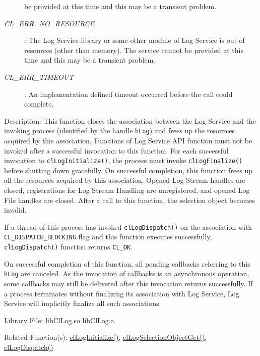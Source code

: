 \begin{flushleft}
\begin{Desc}
\begin{description}
be provided at this time and this may be a transient problem.
\item[{\em CL\_\-ERR\_\-NO\_\-RESOURCE}]:  The Log Service library or some other module of Log Service is out of resources 
(other than memory). The service cannot be provided at this time and this may be a transient problem.
\item[{\em CL\_\-ERR\_\-TIMEOUT}]: An implementation defined timeout occurred before the call could complete.
\end{description}
\end{Desc}
\begin{Desc}
\item[Description:] This function closes the association between the Log Service and the invoking process (identified by the handle {\tt{hLog}}) and frees up
the resources acquired by this association. Functions of Log Service API function must not be invoked after a successful invocation to this 
function. For each successful invocation to {\tt{clLogInitialize()}}, the process must invoke {\tt{clLogFinalize()}} before shutting down gracefully. 
On successful completion, this function frees up all the resources acquired by this association. Opened Log Stream handles are closed, 
registrations for Log Stream Handling are unregistered, and opened Log File handles are closed. After a call to this function, the selection object 
becomes invalid.
\par
If a thread of this process has invoked {\tt{clLogDispatch()}} on the association with {\tt{CL\_\-DISPATCH\_\-BLOCKING}} flag and this function executes 
successfully, {\tt{clLogDispatch()}} function returns {\tt{CL\_\-OK}}. 
\par
On successful completion of this function, all pending callbacks referring to this {\tt{hLog}} are canceled. As the invocation of callbacks is an 
asynchronous operation, some callbacks may still be delivered after this invocation returns successfully.
If a process terminates without finalizing its association with Log Service, Log Service will implicitly finalize all such associations.
\end{Desc}
\begin{Desc}
\item[Library File:] libClLog.so
\newline
libClLog.a
\end{Desc}
\begin{Desc}
\item[Related Function(s):]\hyperlink{pagelog101}{clLogInitialize()}, \hyperlink{pagelog103}{clLogSelectionObjectGet()}, \hyperlink{pagelog104}{clLogDispatch()}\end{Desc}
\newpage






\end{flushleft}
